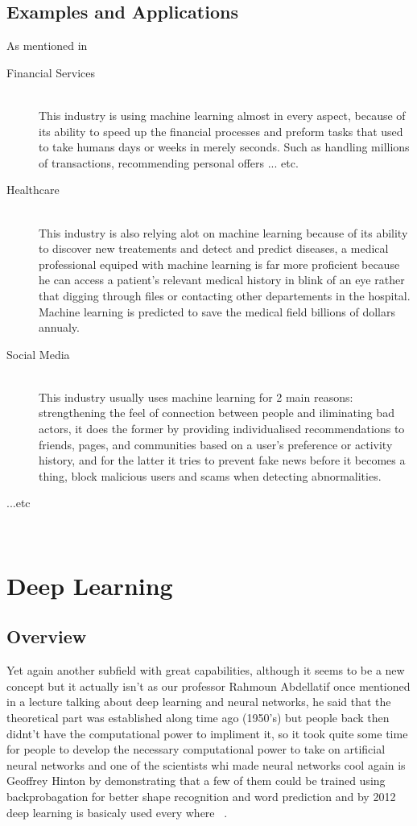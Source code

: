     \subsection{Examples and Applications}
        As mentioned in ~\cite{ml}
        \begin{description}
        \item [Financial Services] \hfill \\
            This industry is using machine learning almost in every aspect, because of its ability to speed up the financial processes and preform tasks that used to take humans days or weeks in merely seconds. Such as handling millions of transactions, recommending personal offers ... etc.
        \item [Healthcare] \hfill \\
            This industry is also relying alot on machine learning because of its ability to discover new treatements and detect and predict diseases, a medical professional equiped with machine learning is far more proficient because he can access a patient's relevant medical history in blink of an eye rather that digging through files or contacting other departements in the hospital. Machine learning is predicted to save the medical field billions of dollars annualy.
        \item [Social Media] \hfill \\
            This industry usually uses machine learning for 2 main reasons: strengthening the feel of connection between people and iliminating bad actors, it does the former by providing individualised recommendations to friends, pages, and communities based on a user's preference or activity history, and for the latter it tries to prevent fake news before it becomes a thing, block malicious users and scams when detecting abnormalities.

        \item [...etc] \hfill \\
        \end{description}

\section{Deep Learning}
    \subsection{Overview}
        Yet again another subfield with great capabilities, although it seems to be a new concept but it actually isn't as our professor Rahmoun Abdellatif once mentioned in a lecture talking about deep learning and neural networks, he said that the theoretical part was established along time ago (1950's) but people back then didnt't have the computational power to impliment it, so it took quite some time for people to develop the necessary computational power to take on artificial neural networks and one of the scientists whi made neural networks cool again is Geoffrey Hinton by demonstrating that a few of them could be trained using backprobagation for better shape recognition and word prediction and by 2012 deep learning is basicaly used every where ~\cite{dl}.

